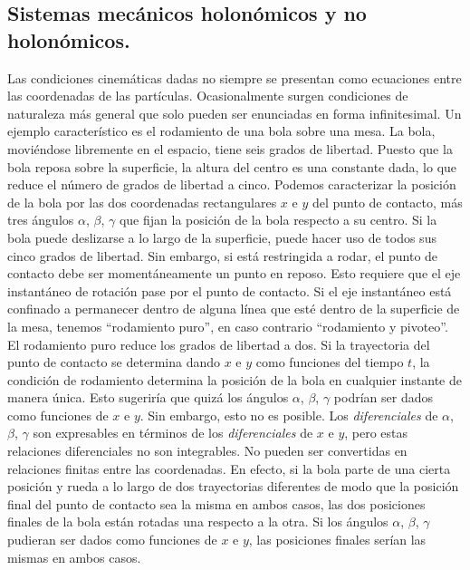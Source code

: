 \documentclass[12pt,a4paper]{book}
\begin{document}
\begin{center}
\section{Sistemas mec\'anicos holon\'omicos y no holon\'omicos.}

Las condiciones cinem\'aticas dadas no siempre se presentan como ecuaciones entre las coordenadas de las part\'iculas. Ocasionalmente surgen condiciones de naturaleza m\'as general que solo pueden ser enunciadas en forma infinitesimal. Un ejemplo caracter\'istico es el rodamiento de una bola sobre una mesa. La bola, movi\'endose libremente en el espacio, tiene seis grados de libertad. Puesto que la bola reposa sobre la superficie, la altura del centro es una constante dada, lo que reduce el n\'umero de grados de libertad a cinco. Podemos caracterizar la posici\'on de la bola por las dos coordenadas rectangulares $x$ e $y$ del punto de contacto, m\'as tres \'angulos $\alpha$, $\beta$, $\gamma$ que fijan la posici\'on de la bola respecto a su centro. Si la bola puede deslizarse a lo largo de la superficie, puede hacer uso de todos sus cinco grados de libertad. Sin embargo, si est\'a restringida a rodar, el punto de contacto debe ser moment\'aneamente un punto en reposo. Esto requiere que el eje instant\'aneo de rotaci\'on pase por el punto de contacto. Si el eje instant\'aneo est\'a confinado a permanecer dentro de alguna l\'inea que est\'e dentro de la superficie de la mesa, tenemos ``rodamiento puro'', en caso contrario ``rodamiento y pivoteo''. El rodamiento puro reduce los grados de libertad a dos. Si la trayectoria del punto de contacto se determina dando $x$ e $y$ como funciones del tiempo $t$, la condici\'on de rodamiento determina la posici\'on de la bola en cualquier instante de manera \'unica. Esto sugerir\'ia que quiz\'a los \'angulos $\alpha$, $\beta$, $\gamma$ podr\'ian ser dados como funciones de $x$ e $y$. Sin embargo, esto no es posible. Los \textit{diferenciales} de $\alpha$, $\beta$, $\gamma$ son expresables en t\'erminos de los \textit{diferenciales} de $x$ e $y$, pero estas relaciones diferenciales no son integrables. No pueden ser convertidas en relaciones finitas entre las coordenadas. En efecto, si la bola parte de una cierta posici\'on y rueda a lo largo de dos trayectorias diferentes de modo que la posici\'on final del punto de contacto sea la misma en ambos casos, las dos posiciones finales de la bola est\'an rotadas una respecto a la otra. Si los \'angulos $\alpha$, $\beta$, $\gamma$ pudieran ser dados como funciones de $x$ e $y$, las posiciones finales ser\'ian las mismas en ambos casos.


\end{center}
\end{document}
